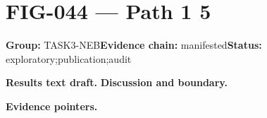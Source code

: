 \clearpage
\section{FIG-044 --- Path 1 5}
\label{figpage:fig-044}
\textbf{Group:} TASK3-NEB\quad \textbf{Evidence chain:} manifested\quad \textbf{Status:} exploratory;publication;audit

\textbf{Results text draft.} 
\textbf{Discussion and boundary.} 


\textbf{Evidence pointers.}



\vfill
